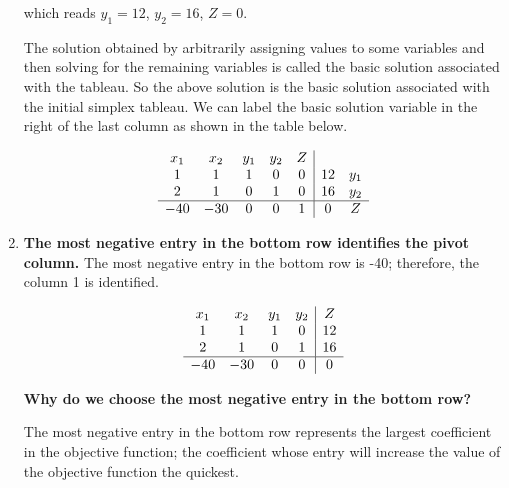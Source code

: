\begin{solution}
\begin{enumerate}
              which reads \(y_1 = 12\), \(y_2 = 16\), \(Z = 0\).

              The solution obtained by arbitrarily assigning values to some variables and then solving for the remaining variables is called the basic solution associated with the tableau. So the above solution is the basic solution associated with the initial simplex tableau. We can label the basic solution variable in the right of the last column as shown in the table below.

              \[
                  \begin{array}{c c c c c | c c}

                      x_1 & x_2 & y_1 & y_2 & Z &    &     \\

                      1   & 1   & 1   & 0   & 0 & 12 & y_1 \\
                      2   & 1   & 0   & 1   & 0 & 16 & y_2 \\
                      \hline
                      -40 & -30 & 0   & 0   & 1 & 0  & Z   \\
                  \end{array}
              \]


        \item \textbf{The most negative entry in the bottom row identifies the pivot column.}
              The most negative entry in the bottom row is -40; therefore, the column 1 is identified.

              \[
                  \begin{array}{c c c c | c}

                      x_1 & x_2 & y_1 & y_2 & Z  \\
                      1   & 1   & 1   & 0   & 12 \\
                      2   & 1   & 0   & 1   & 16 \\
                      \hline
                      -40 & -30 & 0   & 0   & 0  \\
                  \end{array}
              \]

              \textbf{Why do we choose the most negative entry in the bottom row?}

              The most negative entry in the bottom row represents the largest coefficient in the objective function; the coefficient whose entry will increase the value of the objective function the quickest.


\end{enumerate}
\end{solution}
